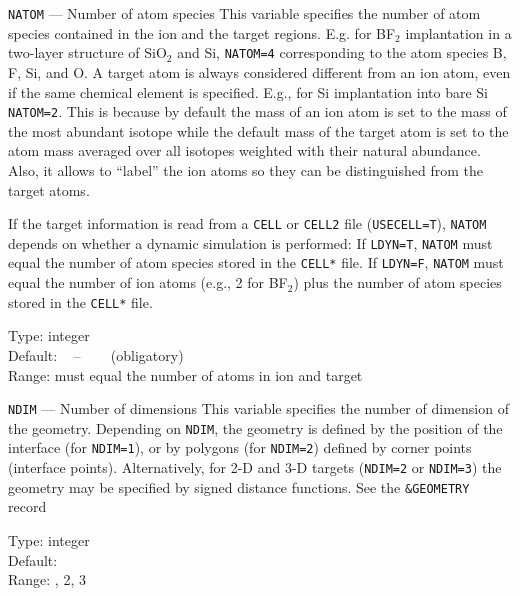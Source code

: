 \begin{keydescription}{\texttt{NATOM} --- Number of atom species}
%
  This variable specifies the number of atom species contained in the
  ion and the target regions. E.g. for BF$_2$ implantation in a
  two-layer structure of SiO$_2$ and Si, \texttt{NATOM=4} corresponding
  to the atom species B, F, Si, and O.  A target atom is always
  considered different from an ion atom, even if the same chemical
  element is specified.  E.g., for Si implantation into bare Si
  \texttt{NATOM=2}.  This is because by default the mass of an ion
  atom is set to the mass of the most abundant isotope while the
  default mass of the target atom is set to the atom mass averaged
  over all isotopes weighted with their natural abundance.  Also, it
  allows to ``label'' the ion atoms so they can be distinguished from
  the target atoms.
  
  If the target information is read from a \texttt{CELL} or \texttt{CELL2}
  file (\texttt{USECELL=T}), \texttt{NATOM} depends on whether a dynamic
  simulation is performed: If \texttt{LDYN=T}, \texttt{NATOM} must equal
  the number of atom species stored in the \texttt{CELL*} file.  If 
  \texttt{LDYN=F}, \texttt{NATOM} must equal the number of ion atoms (e.g., 2
  for BF$_2$) plus the number of atom species  stored in the \texttt{CELL*} 
  file.
%
  \begin{keytab}
    Type:    \> integer \\
    Default: \> ~ -- ~~~ (obligatory) \\
    Range:   \> must equal the number of atoms in ion and target
  \end{keytab}
\end{keydescription}

\begin{keydescription}{\texttt{NDIM} --- Number of dimensions}
%
  This variable specifies the number of dimension of the geometry.
  Depending on \texttt{NDIM}, the geometry is defined by the position of
  the interface (for \texttt{NDIM=1}), or by polygons (for
  \texttt{NDIM=2}) defined by corner points (interface points). 
  Alternatively, for 2-D and 3-D targets (\texttt{NDIM=2} or 
  \texttt{NDIM=3}) the geometry may be specified by signed distance
  functions. See the \texttt{\&GEOMETRY} record
%
  \begin{keytab}
    Type:    \> integer \\
    Default:  \\
    Range:   , 2, 3
  \end{keytab}
\end{keydescription}

